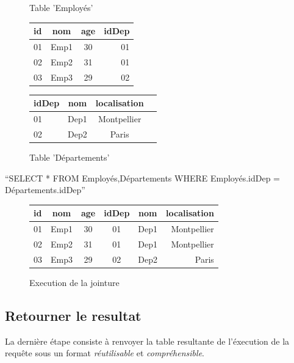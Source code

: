 \documentclass[oneside,13pt,a4paper]{report}
\begin{document}
\begin{figure}[h]
	\begin{minipage}[c]{.46\linewidth}
		\centering
		\caption{Table 'Employés'}
		\begin{tabular}{|l|c|c|r|}
			\hline
			id   & nom  & age & idDep
			\\
			\hline
			01 & Emp1 &  30  & 01 \\
			02 & Emp2 &  31  & 01 \\
			03 & Emp3 &  29  & 02 \\
			\hline
		\end{tabular}
	\end{minipage}
	\hfill%
	\begin{minipage}[c]{.46\linewidth}
		\centering
		\caption{Table 'Départements'}
		\begin{tabular}{|l|c|c|r|}
			\hline
			idDep   & nom   & localisation
			\\
			\hline
			01 & Dep1 &  Montpellier  \\
			02 & Dep2 &  Paris  \\
			\hline
		\end{tabular}
	\end{minipage}
\end{figure}

	\enquote{SELECT * FROM Employés,Départements WHERE Employés.idDep = Départements.idDep}

\begin{figure}[h]
		\centering
		\caption{Execution de la jointure}
		\begin{tabular}{|l|c|c|c|c|r|}
			\hline
			id   & nom  & age & idDep & nom   & localisation
			\\
			\hline
			01 & Emp1 &  30  & 01 & Dep1 &  Montpellier \\
			02 & Emp2 &  31  & 01 & Dep1 &  Montpellier \\
			03 & Emp3 &  29  & 02 & Dep2 &  Paris \\
			\hline
		\end{tabular}
\end{figure}


\subsection{Retourner le resultat}

La dernière étape consiste à renvoyer la table resultante de l'éxecution de la requête sous un format \textit{réutilisable} et \textit{compréhensible}.
\end{document}
